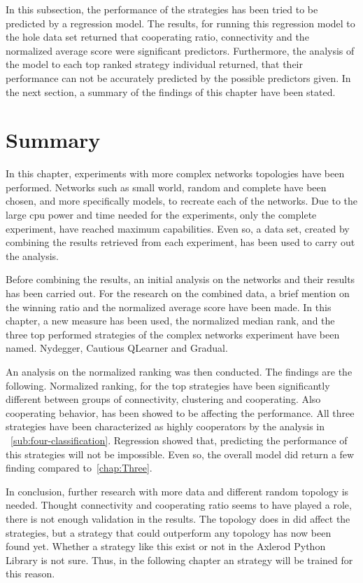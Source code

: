 In this subsection, the performance of the strategies has been tried to be predicted
by a regression model. The results, for running this regression model to the
hole data set returned that cooperating ratio, connectivity and the normalized
average score were significant predictors. Furthermore, the analysis of the model
to each top ranked strategy individual returned, that their performance can not
be accurately predicted by the possible predictors given. In the next section,
a summary of the findings of this chapter have been stated.

\section{Summary}
In this chapter, experiments with more complex networks topologies have been
performed. Networks such as small world, random and complete have been chosen,
and more specifically models, to recreate each of the networks.
Due to the large cpu power and time needed for the experiments, only the complete
experiment, have reached maximum capabilities.
Even so, a data set, created by combining the results retrieved from each experiment,
has been used to carry out the analysis.

Before combining the results, an initial analysis on the networks and their
results has been carried out. For the research on the combined data, a brief
mention on the winning ratio and the normalized average score have been made.
In this chapter, a new measure has been used, the normalized median rank,
and the three top performed strategies of the complex networks experiment have
been named. Nydegger, Cautious QLearner and Gradual.

An analysis on the normalized ranking was then conducted. The findings are the
following. Normalized ranking, for the top strategies have been significantly different
between groups of connectivity, clustering and cooperating. Also cooperating behavior, has been showed to
be affecting the performance. All three strategies have been characterized as highly
cooperators by the analysis in ~\ref{sub:four-classification}. Regression showed that, predicting the
performance of this strategies will not be impossible. Even so, the overall model
did return a few finding compared to~\ref{chap:Three}.

In conclusion, further research with more data and different random topology
is needed. Thought connectivity and cooperating ratio seems to have played a role,
there is not enough validation in the results. The topology does in did affect
the strategies, but a strategy that could outperform any topology has now been
found yet. Whether a strategy like this exist or not in the Axlerod Python Library
is not sure. Thus, in the following chapter an strategy will be trained for
this reason.

